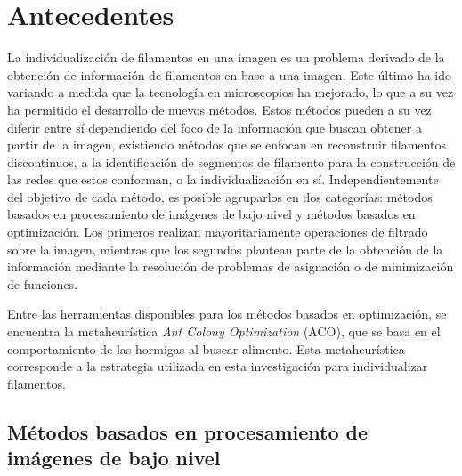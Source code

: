 \chapter{Antecedentes}
\label{chap:stateoftheart}
La individualizaci\'on de filamentos en una imagen es un problema derivado de la obtenci\'on de informaci\'on de filamentos en base a una imagen. Este \'ultimo ha ido variando a medida que la tecnolog\'ia en microscopios ha mejorado, lo que a su vez ha permitido el desarrollo de nuevos m\'etodos. Estos m\'etodos pueden a su vez diferir entre s\'i dependiendo del foco de la informaci\'on que buscan obtener a partir de la imagen, existiendo m\'etodos que se enfocan en reconstruir filamentos discontinuos, a la identificaci\'on de segmentos de filamento para la construcci\'on de las redes que estos conforman, o la individualizaci\'on en s\'i. Independientemente del objetivo de cada m\'etodo, es posible agruparlos en dos categor\'ias: m\'etodos basados en procesamiento de im\'agenes de bajo nivel y m\'etodos basados en optimizaci\'on. Los primeros realizan mayoritariamente operaciones de filtrado sobre la imagen, mientras que los segundos plantean parte de la obtenci\'on de la informaci\'on mediante la resoluci\'on de problemas de asignaci\'on o de minimizaci\'on de funciones.

Entre las herramientas disponibles para los m\'etodos basados en optimizaci\'on, se encuentra la metaheur\'istica {\it Ant Colony Optimization} (ACO), que se basa en el comportamiento de las hormigas al buscar alimento. Esta metaheur\'istica corresponde a la estrategia utilizada en esta investigaci\'on para individualizar filamentos.


\section{M\'etodos basados en procesamiento de im\'agenes de bajo nivel}
\label{sec:NonIndividualizationMethods}

